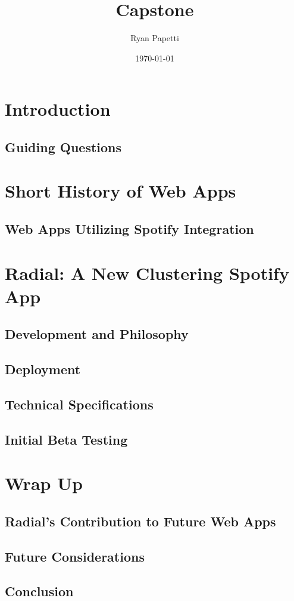 \documentclass[12pt]{article}
\title{Capstone}
\author{Ryan Papetti}
\date{\today}
\begin{document}
\maketitle
\tableofcontents

\section{Introduction}
\subsection{Guiding Questions}

\section{Short History of Web Apps}

\subsection{Web Apps Utilizing Spotify Integration}




\section{Radial: A New Clustering Spotify App}

\subsection{Development and Philosophy}


\subsection{Deployment}


\subsection{Technical Specifications}


\subsection{Initial Beta Testing}


\section{Wrap Up}
\subsection{Radial's Contribution to Future Web Apps}
\subsection{Future Considerations}
\subsection{Conclusion}




\end{document}
